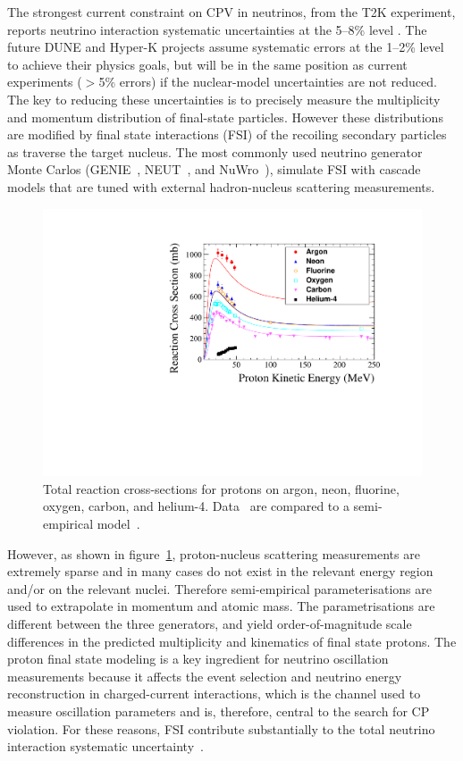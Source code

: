 The strongest current constraint on CPV in neutrinos, from the T2K experiment, reports neutrino interaction systematic uncertainties at the 5--8\% level \cite{Abe:2018wpn}.
The future DUNE and Hyper-K projects assume systematic errors at the 1--2\% level to achieve their physics goals, but will be in the same position as current experiments ($>$5\% errors) if the nuclear-model uncertainties are not reduced.  
The key to reducing these uncertainties is to precisely measure the multiplicity and momentum distribution of final-state particles. 
However these distributions are modified by final state interactions (FSI) of the recoiling secondary particles as traverse the target nucleus.  
The most commonly used neutrino generator Monte Carlos (GENIE~\cite{Andreopoulos:2009rq}, NEUT~\cite{Hayato:2009zz}, and NuWro~\cite{GOLAN2012499}), simulate FSI with cascade models that are tuned with external hadron-nucleus scattering measurements.
\begin{figure}%
    \centering
    \includegraphics[width=12cm]{files/Figures/DataProtonCrossSections.pdf}%
    \caption{Total reaction cross-sections for protons on argon, neon, fluorine, oxygen, carbon, and helium-4. Data~\cite{Carlson:1996ofz} are compared to a semi-empirical model~\cite{wellisch1996total}.}
    \label{fig:DataProtonXSec}%
\end{figure}

However, as shown in figure~\ref{fig:DataProtonXSec}, proton-nucleus scattering measurements are extremely sparse and in many cases do not exist in the relevant energy region and/or on the relevant nuclei.
Therefore semi-empirical parameterisations are used to extrapolate in momentum and atomic mass.  
The parametrisations are different between the three generators, and yield order-of-magnitude scale differences in the predicted multiplicity and kinematics of final state protons.
The proton final state modeling is a key ingredient for neutrino oscillation measurements because it affects the event selection and neutrino energy reconstruction in charged-current interactions, which is the channel used to measure oscillation parameters and is, therefore, central to the search for CP violation\cite{Abe:2013hdq}.
For these reasons, FSI contribute substantially to the total neutrino interaction systematic uncertainty~\cite{Abe:2018wpn}.

